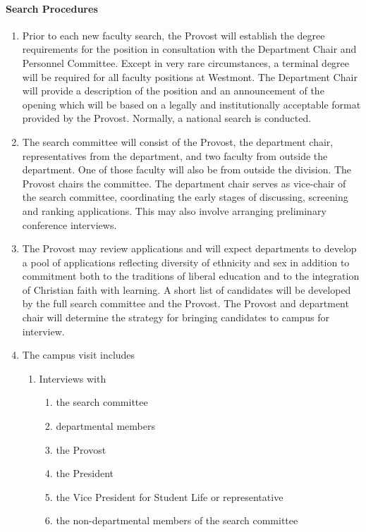 \documentclass[letterpaper, 11pt]{article}
\begin{document}
			\paragraph{Search Procedures}
				\begin{enumerate}[label=\alph*)]
					\item{ Prior to each new faculty search, the Provost will establish the degree requirements for the position in consultation with the Department Chair and Personnel Committee. Except in very rare circumstances, a terminal degree will be required for all faculty positions at Westmont.  The Department Chair will provide a description of the position and an announcement of the opening which will be based on a legally and institutionally acceptable format provided by the Provost.  Normally, a national search is conducted.}
					\item{The search committee will consist of the Provost, the department chair, representatives from the department, and two faculty from outside the department. One of those faculty will also be from outside the division. The Provost chairs the committee. The department chair serves as vice-chair of the search committee, coordinating the early stages of discussing, screening and ranking applications. This may also involve arranging preliminary conference interviews.}
					\item{The Provost may review applications and will expect departments to develop a pool of applications reflecting diversity of ethnicity and sex in addition to commitment both to the traditions of liberal education and to the integration of Christian faith with learning.  A short list of candidates will be developed by the full search committee and the Provost.  The Provost and department chair will determine the strategy for bringing candidates to campus for interview.}
					\item{ The campus visit includes
						\begin{enumerate}[label=(\arabic*)]
							\item{Interviews with
								\begin{enumerate}[label=$\bullet$]
									\item{the search committee}
									\item{departmental members}
									\item{the Provost}
									\item{the President}
									\item{the Vice President for Student Life or representative}
									\item{the non-departmental members of the search committee}

\end{enumerate}}
\end{enumerate}}
\end{enumerate}
\end{document}
